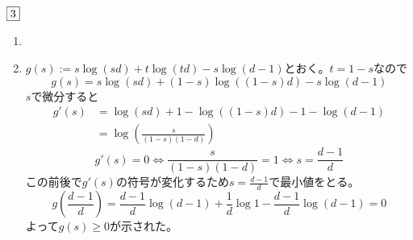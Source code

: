 \documentclass[dvipdfmx]{jsreport}
\newcommand{\N}{\mathbb{N}}
\newcounter{num}[section]
\begin{document}
\begin{answer} %
	$\fbox{3}$
\begin{enumerate}
	\item 
{}

	\item $g(s):= s\log{(sd)}+ t\log{(td)}- s\log{(d- 1)}$とおく。$t= 1- s$なので
\begin{equation*}
	g(s)= s\log{(sd)}+ (1- s)\log{((1- s)d)}- s\log{(d- 1)}
\end{equation*}
	$s$で微分すると
\begin{align*}
	g'(s)
	&= \log{(sd)}+ 1- \log{((1- s)d)}- 1- \log{(d- 1)}\\
	&= \log{\left(\frac{s}{(1- s)(1- d)}\right)}
\end{align*}
\begin{equation*}
	g'(s)= 0\iff \frac{s}{(1- s)(1- d)}= 1\iff s= \frac{d- 1}{d}
\end{equation*}
	この前後で$g'(s)$の符号が変化するため$s= \frac{d- 1}{d}$で最小値をとる。
\begin{equation*}
	g\left(\frac{d- 1}{d}\right)= \frac{d- 1}{d}\log{(d- 1)}+ \frac{1}{d}\log{1}- \frac{d- 1}{d}\log{(d- 1)}= 0
\end{equation*}
	よって$g(s)\ge 0$が示された。


\end{enumerate}
\end{answer}
\end{document}
